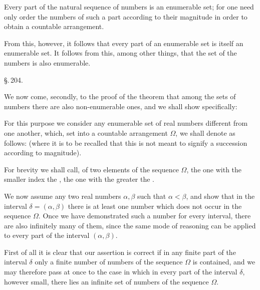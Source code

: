 Every part of the natural sequence of numbers is an enumerable set; for one need only order the numbers of such a part according to their magnitude in order to obtain a countable arrangement.

From this, however, it follows that every part of an enumerable set is itself an enumerable set. It follows from this, among other things, that the set of the  numbers is also enumerable.

\begin{center}
\S.\,204.

\end{center}

We now come, secondly, to the proof of the theorem that among the sets of numbers there are also non-enumerable ones, and we shall show specifically:

\begin{center}
\end{center}

For this purpose we consider any enumerable set of real numbers different from one another, which, set into a countable arrangement $\Omega$, we shall denote as follows:
(where it is to be recalled that this is not meant to signify a succession according to magnitude).

For brevity we shall call, of two elements of the sequence $\Omega$, the one with the smaller index the , the one with the greater the .

We now assume any two real numbers $\alpha, \beta$ such that $\alpha < \beta$, and show that in the interval $\delta = (\alpha, \beta)$ there is at least one number which does not occur in the sequence $\Omega$. Once we have demonstrated such a number for every interval, there are also infinitely many of them, since the same mode of reasoning can be applied to every part of the interval $(\alpha, \beta)$.

First of all it is clear that our assertion is correct if in any finite part of the interval $\delta$ only a finite number of numbers of the sequence $\Omega$ is contained, and we may therefore pass at once to the case in which in every part of the interval $\delta$, however small, there lies an infinite set of numbers of the sequence $\Omega$.
